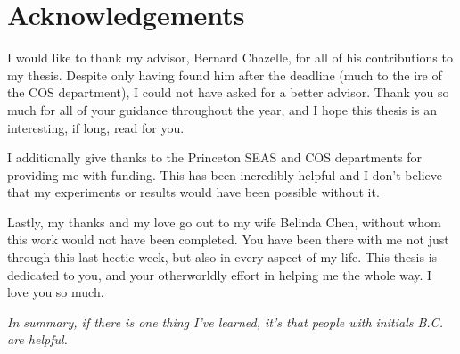 \section*{Acknowledgements}
I would like to thank my advisor, Bernard Chazelle, for all of his contributions to my thesis.
Despite only having found him after the deadline (much to the ire of the COS department), I could not have asked for a better advisor.
Thank you so much for all of your guidance throughout the year, and I hope this thesis is an interesting, if long, read for you.

I additionally give thanks to the Princeton SEAS and COS departments for providing me with funding.
This has been incredibly helpful and I don't believe that my experiments or results would have been possible without it.

Lastly, my thanks and my love go out to my wife Belinda Chen, without whom this work would not have been completed.
You have been there with me not just through this last hectic week, but also in every aspect of my life.
This thesis is dedicated to you, and your otherworldly effort in helping me the whole way.
I love you so much.

\vspace{2\baselineskip}
\begin{center}
\emph{In summary, if there is one thing I've learned, it's that people with initials B.C. are helpful.}
\end{center}

